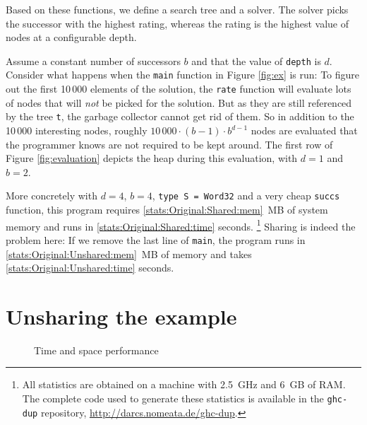 \documentclass[preprint]{sigplanconf}
\theoremstyle{nonumberplain}
\newcommand{\li}{\lstinline[style=Haskell]}
\newcommand{\ci}{\lstinline[style=Cmm]}
\begin{document}
Based on these functions, we define a search tree and a solver. The solver picks the successor with the highest rating, whereas the rating is the highest value of nodes at a configurable depth.

Assume a constant number of successors $b$ and that the value of \li-depth- is $d$. Consider what happens when the \li-main- function in Figure \ref{fig:ex} is run: To figure out the first 10\,000 elements of the solution, the \li-rate- function will evaluate lots of nodes that will \emph{not} be picked for the solution. But as they are still referenced by the tree \li-t-, the garbage collector cannot get rid of them. So in addition to the  10\,000 interesting nodes, roughly $10\,000\cdot (b-1)\cdot b^{d-1}$ nodes are evaluated that the programmer knows are not required to be kept around. The first row of Figure \ref{fig:evaluation} depicts the heap during this evaluation, with $d=1$ and $b=2$.

\newcommand{\stats}[1]{\ref*{#1}}
More concretely with $d=4$, $b=4$, \li-type S = Word32- and a very cheap \li-succs- function, this program requires \stats{stats:Original:Shared:mem}~MB of system memory and runs in \stats{stats:Original:Shared:time} seconds.%
\footnote{All statistics are obtained on a machine with 2.5~GHz and 6~GB of RAM. The complete code used to generate these statistics is available in the \ci!ghc-dup! repository, \url{http://darcs.nomeata.de/ghc-dup}.} Sharing is indeed the problem here: If we remove the last line of \li-main-, the program runs in \stats{stats:Original:Unshared:mem}~MB of memory and takes \stats{stats:Original:Unshared:time} seconds.

\section{Unsharing the example}
\label{sec:unsharing}

\begin{figure*}
\centering

\caption{Time and space performance}
\label{fig:stats}
\end{figure*}
\end{document}

